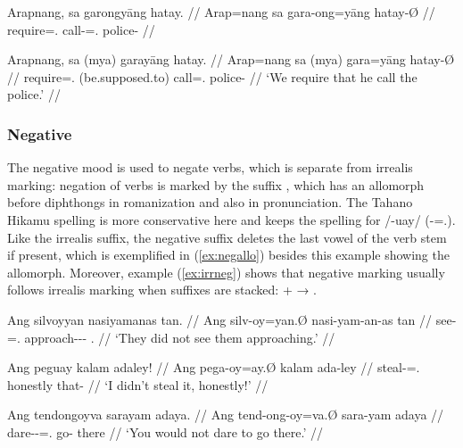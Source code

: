 \pex
\a\ljudge*\begingl
	\gla Arapnang, sa garongyāng hatay. //
	\glb Arap=nang sa gara-ong=yāng hatay-Ø //
	\glc require=\Fpl{}.\Aarg{} \PatT{} call-\Irr{}=\TsgM{}.\Aarg{} 
		police-\Top{} //
\endgl

\a\label{ex:myashall}\begingl
	\gla Arapnang, sa (mya) garayāng hatay. //
	\glb Arap=nang sa (mya) gara=yāng hatay-Ø //
	\glc require=\Fpl{}.\Aarg{} \PatT{} (be.supposed.to) 
		call=\TsgM{}.\Aarg{} police-\Top{} //
	\glft `We require that he call the police.' //
\endgl
\xe


\subsubsection{Negative}
\label{subsubsec:verbneg}

The negative mood is used to negate verbs, which is separate from irrealis 
marking: negation of verbs is marked by the suffix , which has 
an allomorph  before diphthongs in romanization and also in 
pronunciation. The Tahano Hikamu spelling is more conservative 
here and keeps the spelling   for /-uay/ 
(-\Neg{}=\Fsg{}.\Top{}). Like the irrealis suffix, the 
negative suffix deletes the last vowel of the verb stem if present, which is 
exemplified in (\ref{ex:negallo}) besides this example showing the  
allomorph. Moreover, example (\ref{ex:irrneg}) shows that negative marking 
usually follows irrealis marking when suffixes are stacked:  + 
 → .

\pex
\a\label{ex:negative}\begingl
	\gla Ang silvoyyan nasiyamanas tan. //
	\glb Ang silv-oy=yan.Ø nasi-yam-an-as tan //
	\glc \AgtT{} see-\Neg{}=\TplM{}.\Top{} approach-\Ptcp{}-\Nmlz{}-\Parg{} 
		\TplM{}.\Gen{} //
	\glft `They did not see them approaching.' //
\endgl

\a\label{ex:negallo}\begingl
	\gla Ang peguay kalam adaley!  //
	\glb Ang pega-oy=ay.Ø kalam ada-ley //
	\glc \AgtT{} steal-\Neg{}=\Fsg{}.\Top{} honestly that-\PargI{} //
	\glft `I didn't steal it, honestly!' //
\endgl

\a\label{ex:irrneg}\begingl
	\gla Ang tendongoyva sarayam adaya. //
	\glb Ang tend-ong-oy=va.Ø sara-yam adaya //
	\glc \AgtT{} dare-\Irr{}-\Neg{}=\Ssg{}.\Top{} go-\Ptcp{} there //
	\glft `You would not dare to go there.' //
\endgl

\xe

